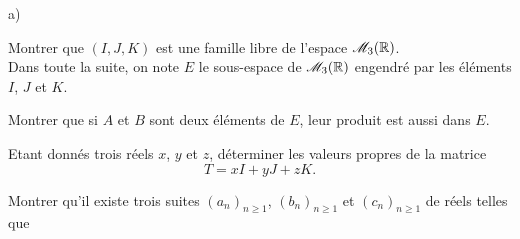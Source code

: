 \documentclass[11pt]{article}%
\begin{document}
\item
\begin{noliste}{a)}
 \setlength{\itemsep}{2mm}
\item
Montrer que $(I,J,K)$ est une famille libre de l'espace $\mathscr{M}_{3}(\mathbb{R})$.\\
Dans toute la suite, on note $E$ le sous-espace de $\mathscr{M}_{3}(\mathbb{R})$ engendré par
les éléments $I$, $J$ et $K$.
\item
Montrer que si $A$ et $B$ sont deux éléments de $E$, leur produit est
aussi dans $E$.
\item
Etant donnés trois réels $x$, $y$ et $z$, déterminer les valeurs
propres de la matrice 
\[
T = xI + yJ + zK.
\]
 \end{noliste}
 \item
 Montrer qu'il existe trois suites $(a_{n})_{n\geq1}$,
$(b_{n})_{n\geq1}$ et $(c_{n})_{n\geq1}$ de réels telles que
 
\end{document}
